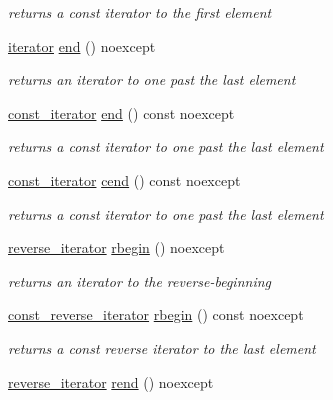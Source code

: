 \begin{DoxyCompactItemize}
\begin{DoxyCompactList}\small\item\em returns a const iterator to the first element \end{DoxyCompactList}\item 
\hyperlink{classnlohmann_1_1basic__json_1_1iterator}{iterator} \hyperlink{classnlohmann_1_1basic__json_a12ccf14d39ddae52f6c7e126105a230b}{end} () noexcept
\begin{DoxyCompactList}\small\item\em returns an iterator to one past the last element \end{DoxyCompactList}\item 
\hyperlink{classnlohmann_1_1basic__json_1_1const__iterator}{const\+\_\+iterator} \hyperlink{classnlohmann_1_1basic__json_abd7e95159740e94160c13392b1536eb1}{end} () const noexcept
\begin{DoxyCompactList}\small\item\em returns a const iterator to one past the last element \end{DoxyCompactList}\item 
\hyperlink{classnlohmann_1_1basic__json_1_1const__iterator}{const\+\_\+iterator} \hyperlink{classnlohmann_1_1basic__json_aa730d68d55ccc48d2cd4835ff46d2a0f}{cend} () const noexcept
\begin{DoxyCompactList}\small\item\em returns a const iterator to one past the last element \end{DoxyCompactList}\item 
\hyperlink{classnlohmann_1_1basic__json_a2f1f83aa187a56dc5ec7a7027065ac8a}{reverse\+\_\+iterator} \hyperlink{classnlohmann_1_1basic__json_a62ccf5b9b3674aec2403fbc02da03db8}{rbegin} () noexcept
\begin{DoxyCompactList}\small\item\em returns an iterator to the reverse-\/beginning \end{DoxyCompactList}\item 
\hyperlink{classnlohmann_1_1basic__json_ae336fff01f4b78e3e16e5008dc8dbc00}{const\+\_\+reverse\+\_\+iterator} \hyperlink{classnlohmann_1_1basic__json_a15e70a44e2a8db929694819fed256653}{rbegin} () const noexcept
\begin{DoxyCompactList}\small\item\em returns a const reverse iterator to the last element \end{DoxyCompactList}\item 
\hyperlink{classnlohmann_1_1basic__json_a2f1f83aa187a56dc5ec7a7027065ac8a}{reverse\+\_\+iterator} \hyperlink{classnlohmann_1_1basic__json_aaa160a960dd3dd90856a72b1d8dbe707}{rend} () noexcept

\end{DoxyCompactItemize}
